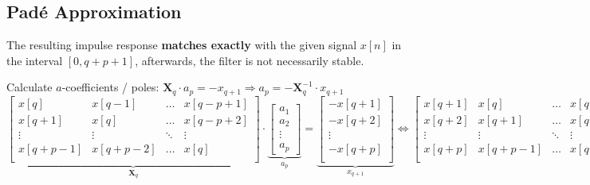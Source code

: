 \subsection{Padé Approximation}
The resulting impulse response \textbf{matches exactly} with the given signal $x[n]$ in the interval $[0, q + p + 1]$,
afterwards, the filter is not necessarily stable.

	\renewcommand{\arraystretch}{1.0}
	\begin{aufzaehlung}
  		\item Calculate $a$-coefficients / poles: $\bm X_q \cdot a_p = -x_{q+1} \Longrightarrow a_p = - \bm X_q^{-1} \cdot x_{q+1}$ \small $$
		\underbrace{ \begin{bmatrix}
    		x[q]     & x[q-1]   & \hdots & x[q-p+1] \\
    		x[q+1]   & x[q]     & \hdots & x[q-p+2] \\
    		\vdots   & \vdots   & \ddots & \vdots \\
    		x[q+p-1] & x[q+p-2] & \hdots & x[q] \\
		\end{bmatrix}
		}_{\bm  X_q} \cdot
		\underbrace{\begin{bmatrix}
    		a_1 \\
    		a_2 \\
    		\vdots \\
    		a_p
		\end{bmatrix}  }_{a_p} = \underbrace{\begin{bmatrix}
    		-x [q+1]\\
    		-x [q+2]\\
    		\vdots \\
    		-x [q+p]\\
		\end{bmatrix}}_{x_{q+1}}  \Longleftrightarrow
		\begin{bmatrix}
    		x[q+1] & x[q] & \hdots & x[q+1-p] \\
    		x[q+2] & x[q+1] & \hdots & x[q+2-p] \\
    		\vdots & \vdots & \ddots & \vdots \\
    		x[q+p] & x[q+p-1] & \hdots & x[q] \\
		\end{bmatrix}
		\begin{bmatrix}
    		1 \\
    		a_1 \\
    		\vdots \\
    		a_p
		\end{bmatrix} =
		\begin{bmatrix}
    		0 \\
    		0 \\
    		\vdots \\
    		0
		\end{bmatrix}
		$$  \normalsize


\end{aufzaehlung}
